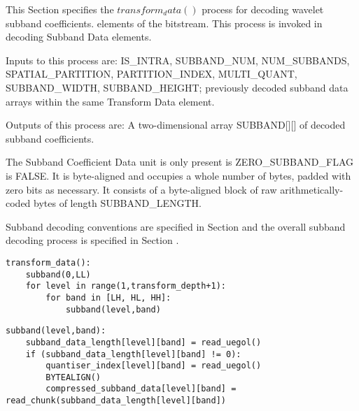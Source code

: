 This Section specifies the $transform_data()$ process for decoding wavelet subband
coefficients.
elements of the bitstream. This process is invoked in decoding Subband
Data elements.

Inputs to this process are: IS\_INTRA, SUBBAND\_NUM, NUM\_SUBBANDS,
SPATIAL\_PARTITION, PARTITION\_INDEX, MULTI\_QUANT, SUBBAND\_WIDTH,
SUBBAND\_HEIGHT; previously decoded subband data arrays within the same
Transform Data element.

Outputs of this process are: A two-dimensional array SUBBAND[][] of
decoded subband coefficients.

 The Subband Coefficient Data unit is only present is ZERO\_SUBBAND\_FLAG is
FALSE. It is byte-aligned and occupies a whole number of bytes, padded
with zero bits as necessary. It consists of a byte-aligned block of raw
arithmetically-coded bytes of length SUBBAND\_LENGTH.

Subband decoding conventions are specified in Section  and the overall
subband decoding process is specified in Section .

\begin{verbatim}
transform_data():
    subband(0,LL)
    for level in range(1,transform_depth+1):
        for band in [LH, HL, HH]:
            subband(level,band)
\end{verbatim}

\begin{verbatim}
subband(level,band):
    subband_data_length[level][band] = read_uegol()
    if (subband_data_length[level][band] != 0):
        quantiser_index[level][band] = read_uegol()
        BYTEALIGN()
        compressed_subband_data[level][band] = read_chunk(subband_data_length[level][band])
\end{verbatim}


